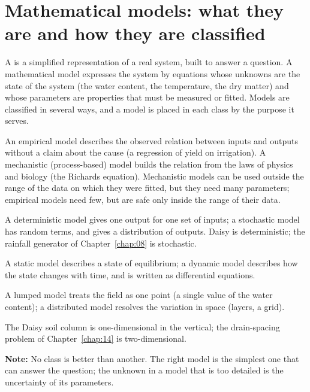 \section{Mathematical models: what they are and how they are classified}
A  is a simplified representation of a real system, built to answer a question. A mathematical model expresses the system by equations whose unknowns are the state of the system (the water content, the temperature, the dry matter) and whose parameters are properties that must be measured or fitted. Models are classified in several ways, and a model is placed in each class by the purpose it serves.
\begin{exlist}
\item {} An empirical model describes the observed relation between inputs and outputs without a claim about the cause (a regression of yield on irrigation). A mechanistic (process-based) model builds the relation from the laws of physics and biology (the Richards equation). Mechanistic models can be used outside the range of the data on which they were fitted, but they need many parameters; empirical models need few, but are safe only inside the range of their data.
\item {} A deterministic model gives one output for one set of inputs; a stochastic model has random terms, and gives a distribution of outputs. Daisy is deterministic; the rainfall generator of Chapter~\ref{chap:08} is stochastic.
\item {} A static model describes a state of equilibrium; a dynamic model describes how the state changes with time, and is written as differential equations.
\item {} A lumped model treats the field as one point (a single value of the water content); a distributed model resolves the variation in space (layers, a grid).
\item {} The Daisy soil column is one-dimensional in the vertical; the drain-spacing problem of Chapter~\ref{chap:14} is two-dimensional.
\end{exlist}
\noindent\textbf{Note:} No class is better than another. The right model is the simplest one that can answer the question; the unknown in a model that is too detailed is the uncertainty of its parameters.

